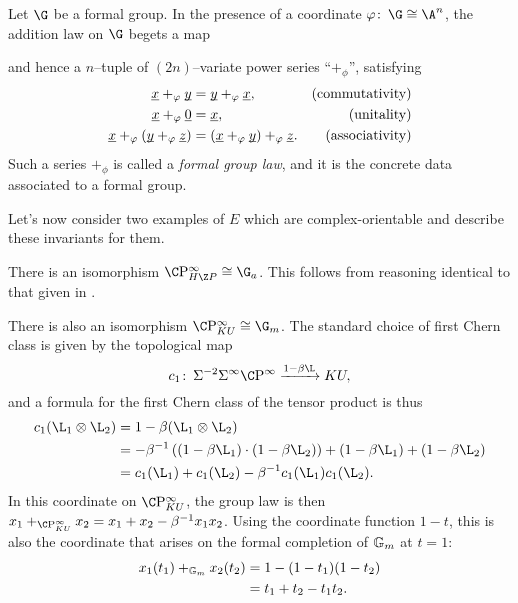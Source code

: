 \begin{definition}\label{FGLDefinition}
Let $\G$ be a formal group.  In the presence of a coordinate $\phi \co \G \cong \A^n$, the addition law on $\G$ begets a map
\begin{center}
\end{center}
and hence a $n$--tuple of $(2n)$--variate power series ``$+_\phi$'', satisfying
\begin{align*}
\underline{\smash x} +_\phi \underline{\smash y} & = \underline{\smash y} +_\phi \underline{\smash x}, & \text{(commutativity)} \\
\underline{\smash x} +_\phi \underline{\smash 0} & = \underline{\smash x}, & \text{(unitality)} \\
\underline{\smash x} +_\phi (\underline{\smash y} +_\phi \underline{\smash z}) & = (\underline{\smash x} +_\phi \underline{\smash y}) +_\phi \underline{\smash z}. & \text{(associativity)}
\end{align*}
Such a series $+_\phi$ is called a \textit{formal group law}, and it is the concrete data associated to a formal group.
\end{definition}

Let's now consider two examples of $E$ which are complex-orientable and describe these invariants for them.

\begin{example}\label{HZGivesGa}
There is an isomorphism $\CP^\infty_{H\Z P} \cong \G_a$.  This follows from reasoning identical to that given in .
\end{example}

\begin{example}\label{CPinftyKUExample}
There is also an isomorphism $\CP^\infty_{KU} \cong \G_m$.  The standard choice of first Chern class is given by the topological map \[c_1\co \Susp^{-2} \Susp^\infty \CP^\infty \xrightarrow{1 - \beta \L} KU,\] and a formula for the first Chern class of the tensor product is thus
\begin{align*}
c_1(\L_1 \otimes \L_2) & = 1 - \beta(\L_1 \otimes \L_2) \\
& = -\beta^{-1} \left( (1 - \beta \L_1) \cdot (1 - \beta \L_2) \right) + (1 - \beta \L_1) + (1 - \beta \L_2) \\
& = c_1(\L_1) + c_1(\L_2) - \beta^{-1} c_1(\L_1) c_1(\L_2).
\end{align*}
In this coordinate on $\CP^\infty_{KU}$, the group law is then $x_1 +_{\CP^\infty_{KU}} x_2 = x_1 + x_2 - \beta^{-1} x_1 x_2$.  Using the coordinate function $1 - t$, this is also the coordinate that arises on the formal completion of $\Gm$ at $t = 1$:
\begin{align*}
x_1(t_1) +_{\Gm} x_2(t_2) & = 1 - (1 - t_1)(1 - t_2) \\
& = t_1 + t_2 - t_1 t_2.
\end{align*}
\end{example}

